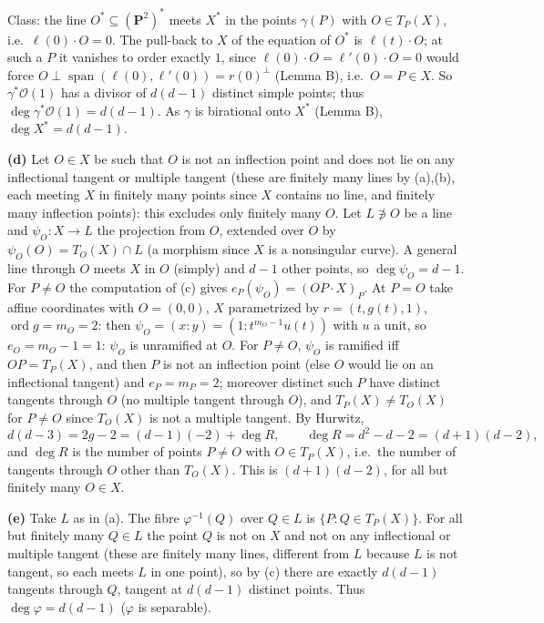 \documentclass[11pt]{article}
\begin{document}
Class: the line $O^*\subseteq(\mathbf P^2)^*$ meets $X^*$ in the points $\gamma(P)$ with $O\in T_P(X)$, i.e.\ $\ell(0)\cdot O=0$. The pull-back to $X$ of the equation of $O^*$ is $\ell(t)\cdot O$; at such a $P$ it vanishes to order exactly $1$, since $\ell(0)\cdot O=\ell'(0)\cdot O=0$ would force $O\perp\operatorname{span}(\ell(0),\ell'(0))=r(0)^\perp$ (Lemma B), i.e.\ $O=P\in X$. So $\gamma^*\mathcal O(1)$ has a divisor of $d(d-1)$ distinct simple points; thus $\deg\gamma^*\mathcal O(1)=d(d-1)$. As $\gamma$ is birational onto $X^*$ (Lemma B), $\deg X^*=d(d-1)$.

\textbf{(d)} Let $O\in X$ be such that $O$ is not an inflection point and does not lie on any inflectional tangent or multiple tangent (these are finitely many lines by (a),(b), each meeting $X$ in finitely many points since $X$ contains no line, and finitely many inflection points): this excludes only finitely many $O$. Let $L\not\ni O$ be a line and $\psi_O:X\to L$ the projection from $O$, extended over $O$ by $\psi_O(O)=T_O(X)\cap L$ (a morphism since $X$ is a nonsingular curve). A general line through $O$ meets $X$ in $O$ (simply) and $d-1$ other points, so $\deg\psi_O=d-1$. For $P\ne O$ the computation of (c) gives $e_P(\psi_O)=(OP\cdot X)_P$. At $P=O$ take affine coordinates with $O=(0,0)$, $X$ parametrized by $r=(t,g(t),1)$, $\operatorname{ord}g=m_O=2$: then $\psi_O=(x:y)=(1:t^{m_O-1}u(t))$ with $u$ a unit, so $e_O=m_O-1=1$: $\psi_O$ is unramified at $O$. For $P\ne O$, $\psi_O$ is ramified iff $OP=T_P(X)$, and then $P$ is not an inflection point (else $O$ would lie on an inflectional tangent) and $e_P=m_P=2$; moreover distinct such $P$ have distinct tangents through $O$ (no multiple tangent through $O$), and $T_P(X)\ne T_O(X)$ for $P\ne O$ since $T_O(X)$ is not a multiple tangent. By Hurwitz,
\[
d(d-3)=2g-2=(d-1)(-2)+\deg R,\qquad \deg R=d^2-d-2=(d+1)(d-2),
\]
and $\deg R$ is the number of points $P\ne O$ with $O\in T_P(X)$, i.e.\ the number of tangents through $O$ other than $T_O(X)$. This is $(d+1)(d-2)$, for all but finitely many $O\in X$.

\textbf{(e)} Take $L$ as in (a). The fibre $\varphi^{-1}(Q)$ over $Q\in L$ is $\{P:Q\in T_P(X)\}$. For all but finitely many $Q\in L$ the point $Q$ is not on $X$ and not on any inflectional or multiple tangent (these are finitely many lines, different from $L$ because $L$ is not tangent, so each meets $L$ in one point), so by (c) there are exactly $d(d-1)$ tangents through $Q$, tangent at $d(d-1)$ distinct points. Thus $\deg\varphi=d(d-1)$ ($\varphi$ is separable).
\end{document}
